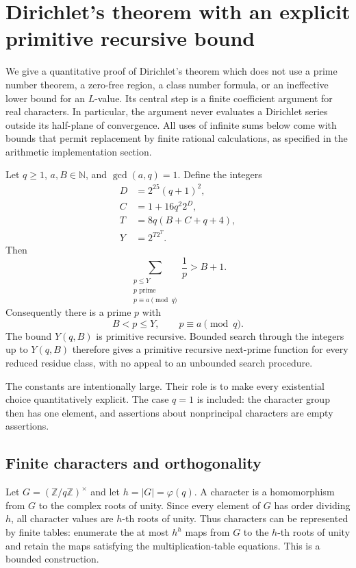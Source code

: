 \section{Dirichlet's theorem with an explicit primitive recursive bound}
\label{sec:direct-dirichlet}

We give a quantitative proof of Dirichlet's theorem which does not use a
prime number theorem, a zero-free region, a class number formula, or an
ineffective lower bound for an $L$-value.  Its central step is a finite
coefficient argument for real characters.  In particular, the argument never
evaluates a Dirichlet series outside its half-plane of convergence.  All
uses of infinite sums below come with bounds that permit replacement by
finite rational calculations, as specified in the arithmetic implementation
section.

\begin{theorem}
\label{thm:dirichlet-explicit}
Let $q\geq1$, $a,B\in\mathbb N$, and $\gcd(a,q)=1$. Define the integers
\begin{align*}
 D&=2^{25}(q+1)^2,\\
 C&=1+16q^2 2^D,\\
 T&=8q(B+C+q+4),\\
 Y&=2^{T2^T}.
\end{align*}
Then
\[
 \sum_{\substack{p\leq Y\\p\text{ prime}\\p\equiv a\pmod q}}
       \frac1p>B+1.
\]
Consequently there is a prime $p$ with
\[
 B<p\leq Y,\qquad p\equiv a\pmod q.
\]
The bound $Y(q,B)$ is primitive recursive.  Bounded search through the
integers up to $Y(q,B)$ therefore gives a primitive recursive next-prime
function for every reduced residue class, with no appeal to an unbounded
search procedure.
\end{theorem}

The constants are intentionally large.  Their role is to make every
existential choice quantitatively explicit.  The case $q=1$ is included:
the character group then has one element, and assertions about
nonprincipal characters are empty assertions.

\subsection{Finite characters and orthogonality}

Let $G=(\mathbb Z/q\mathbb Z)^\times$ and let $h=|G|=\varphi(q)$.
A character is a homomorphism from $G$ to the complex roots of unity.
Since every element of $G$ has order dividing $h$, all character values are
$h$-th roots of unity.  Thus characters can be represented by finite tables:
enumerate the at most $h^h$ maps from $G$ to the $h$-th roots of unity and
retain the maps satisfying the multiplication-table equations.  This is
a bounded construction.

